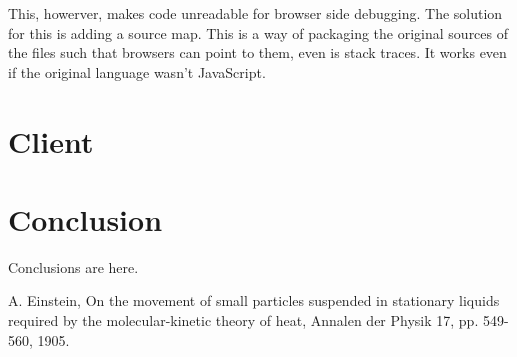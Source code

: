\documentclass{llncs}
\begin{document}
This, howerver, makes code unreadable for browser side debugging. The solution for this is adding a source map. This is a way of packaging the original sources of the files such that browsers can point to them, even is stack traces. It works even if the original language wasn't JavaScript.

\section{Client}



\section{Conclusion}

Conclusions are here.

\begin{thebibliography}{1}

A. Einstein, On the movement of small particles suspended in stationary liquids required by the molecular-kinetic theory of heat, Annalen der Physik 17, pp. 549-560, 1905.

\end{thebibliography}
\end{document}

